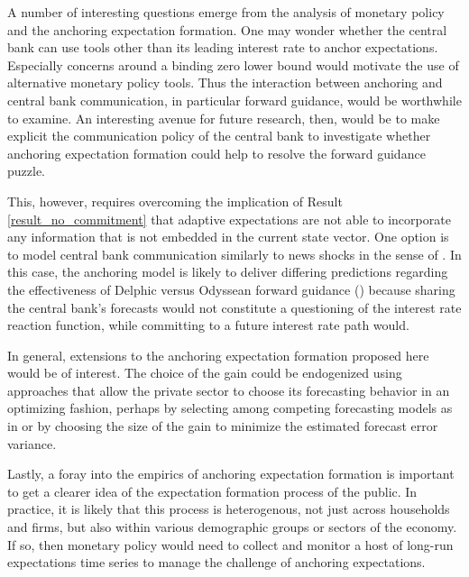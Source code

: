\documentclass[11pt]{article}
\def \myBibPath {../../literature/}
\renewcommand{\[}{\begin{equation}}
\renewcommand{\]}{\end{equation}}
\begin{document}
A number of interesting questions emerge from the analysis of monetary policy and the anchoring expectation formation. One may wonder whether the central bank can use tools other than its leading interest rate to anchor expectations. Especially concerns around a binding zero lower bound would motivate the use of alternative monetary policy tools. Thus the interaction between anchoring and central bank communication, in particular forward guidance, would be worthwhile to examine. An interesting avenue for future research, then, would be to make explicit the communication policy of the central bank to investigate whether anchoring expectation formation could help to resolve the forward guidance puzzle. 

This, however, requires overcoming the implication of Result \ref{result_no_commitment} that adaptive expectations are not able to incorporate any information that is not embedded in the current state vector. One option is to model central bank communication similarly to news shocks in the sense of \cite{beaudry2006stock}. In this case, the anchoring model is likely to deliver differing predictions regarding the effectiveness of Delphic versus Odyssean forward guidance (\cite{campbell2012macroeconomic}) because sharing the central bank's forecasts would not constitute a questioning of the interest rate reaction function, while committing to a future interest rate path would.

In general, extensions to the anchoring expectation formation proposed here would be of interest. The choice of the gain could be endogenized using approaches that allow the private sector to choose its forecasting behavior in an optimizing fashion, perhaps by selecting among competing forecasting models as in \cite{Branch2011} or by choosing the size of the gain to minimize the estimated forecast error variance. 

Lastly, a foray into the empirics of anchoring expectation formation is important to get a clearer idea of the expectation formation process of the public. In practice, it is likely that this process is heterogenous, not just across households and firms, but also within various demographic groups or sectors of the economy. If so, then monetary policy would need to collect and monitor a host of long-run expectations time series to manage the challenge of anchoring expectations. 



\clearpage
\newpage


\end{document}
